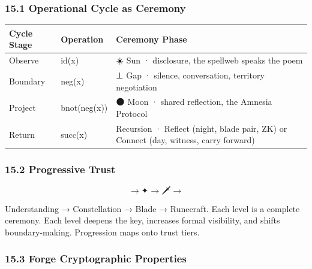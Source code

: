 \documentclass[
  11pt,
]{article}
\newcounter{none} %
\begin{document}
\subsubsection{15.1 Operational Cycle as
Ceremony}\label{operational-cycle-as-ceremony}

{\def\LTcaptype{none} %
\begin{longtable}[]{@{}
  >{\raggedright\arraybackslash}p{}
  >{\raggedright\arraybackslash}p{}
  >{\raggedright\arraybackslash}p{}@{}}
\toprule\noalign{}
\begin{minipage}[b]{\linewidth}\raggedright
Cycle Stage
\end{minipage} & \begin{minipage}[b]{\linewidth}\raggedright
Operation
\end{minipage} & \begin{minipage}[b]{\linewidth}\raggedright
Ceremony Phase
\end{minipage} \\
\midrule\noalign{}
\endhead
\bottomrule\noalign{}
\endlastfoot
Observe & id(x) & ☀️ Sun · disclosure, the spellweb speaks the poem \\
Boundary & neg(x) & ⊥ Gap · silence, conversation, territory
negotiation \\
Project & bnot(neg(x)) & 🌑 Moon · shared reflection, the Amnesia
Protocol \\
Return & succ(x) & Recursion · Reflect (night, blade pair, ZK) or
Connect (day, witness, carry forward) \\
\end{longtable}
}

\subsubsection{15.2 Progressive Trust}\label{progressive-trust}

\[\text{🔑} \to \text{✦} \to \text{🗡️} \to \text{🔮}\]

Understanding → Constellation → Blade → Runecraft. Each level is a
complete ceremony. Each level deepens the key, increases formal
visibility, and shifts boundary-making. Progression maps onto trust
tiers.

\subsubsection{15.3 Forge Cryptographic
Properties}\label{forge-cryptographic-properties}
\end{document}
